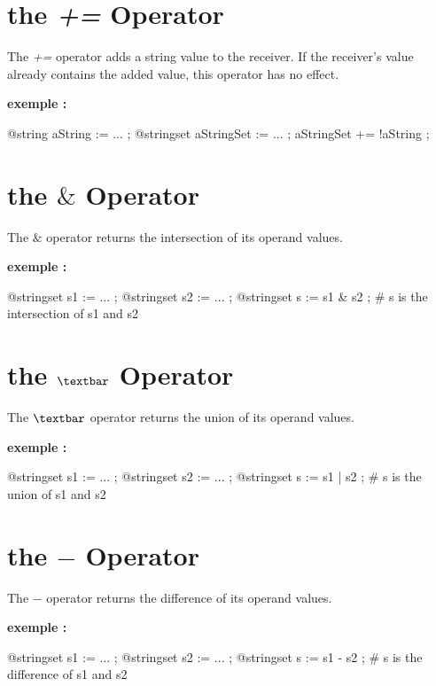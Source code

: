 \section{the \emph{+=} Operator}

The \emph{+=} operator adds a string value to the receiver. If the receiver's value already contains the added value, this operator has no effect.

\textbf{exemple :}
\begin{galgascode}
@string aString := ... ;
@stringset aStringSet := ... ;
aStringSet += !aString ;
\end{galgascode}




\section{the \emph{$\&$} Operator}

The \emph{$\&$} operator returns the intersection of its operand values.

\textbf{exemple :}
\begin{galgascode}
@stringset s1 := ... ;
@stringset s2 := ... ;
@stringset s := s1 & s2 ; # s is the intersection of s1 and s2
\end{galgascode}






\section{the \emph{$\textbar$} Operator}

The \emph{$\textbar$} operator returns the union of its operand values.

\textbf{exemple :}
\begin{galgascode}
@stringset s1 := ... ;
@stringset s2 := ... ;
@stringset s := s1 | s2 ; # s is the union of s1 and s2
\end{galgascode}






\section{the \emph{$-$} Operator}

The \emph{$-$} operator returns the difference of its operand values.

\textbf{exemple :}
\begin{galgascode}
@stringset s1 := ... ;
@stringset s2 := ... ;
@stringset s := s1 - s2 ; \# s is the difference of s1 and s2
\end{galgascode}








